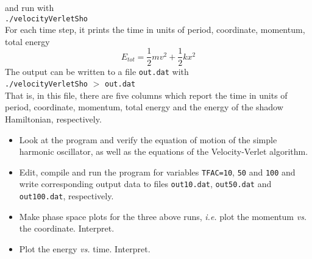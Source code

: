 \documentclass[a4paper,12pt]{article}
\begin{document}
\begin{enumerate}
\noindent and run with\\
\noindent \texttt{./velocityVerletSho} \\
\noindent For each time step, it prints the time in units of period, coordinate, momentum, total energy 
\begin{equation}
E_{\mathit{tot}} = \frac{1}{2} m v^2 + \frac{1}{2}  k x^2
\end{equation}
The output can be written to a file \texttt{out.dat} with \\
\noindent  \texttt{./velocityVerletSho} $>$ \texttt{out.dat} \\
\noindent That is, in this file, there are five columns which report
the time in units of period, coordinate, momentum, total energy and the energy of the shadow Hamiltonian, respectively.
\begin{itemize}
\item Look at the program and verify the equation of motion of the simple harmonic oscillator, as well as the equations of the Velocity-Verlet algorithm.
\item Edit, compile and run the program for variables \texttt{TFAC=10}, \texttt{50} and \texttt{100} and write corresponding output data to files
\texttt{out10.dat},
\texttt{out50.dat} and
\texttt{out100.dat}, respectively.
\item Make phase space plots for the three above runs, {\em i.e.} plot the momentum {\em vs.} the coordinate. Interpret.
\item Plot the energy {\em vs.} time. Interpret.
\end{itemize}
\end{enumerate}
%
%
%
\end{document}
